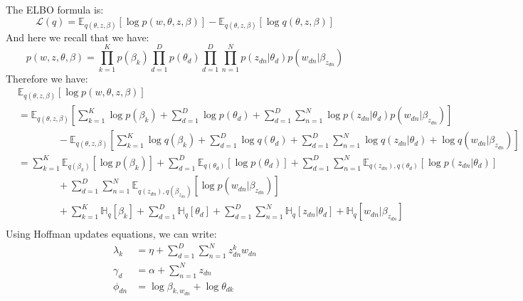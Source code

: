 \documentclass{article}
\begin{document}
The ELBO formula is:
\begin{equation}
    \mathcal{L}(q) = \mathbb{E}_{q(\theta, z, \beta)}[\log p(w, \theta, z, \beta)] - \mathbb{E}_{q(\theta, z, \beta)}[\log q(\theta, z, \beta)]
\end{equation}
And here we recall that we have:
\begin{equation}
    p(w,z,\theta,\beta) = \prod_{k=1}^{K}p(\beta_k) \prod_{d=1}^{D}p(\theta_d) \prod_{d=1}^{D}\prod_{n=1}^{N}p(z_{dn}|\theta_d)p(w_{dn}|\beta_{z_{dn}})
\end{equation}
Therefore we have:
\begin{equation}
    \begin{split}
         & \mathbb{E}_{q(\theta, z, \beta)}[\log p(w, \theta, z, \beta)]                                                                                                                                                     \\
         & = \mathbb{E}_{q(\theta, z, \beta)}\left[\sum_{k=1}^{K}\log p(\beta_k) + \sum_{d=1}^{D}\log p(\theta_d) + \sum_{d=1}^{D}\sum_{n=1}^{N}\log p(z_{dn}|\theta_d)p(w_{dn}|\beta_{z_{dn}})\right]                       \\
         & \qquad\qquad - \mathbb{E}_{q(\theta, z, \beta)}\left[\sum_{k=1}^{K}\log q(\beta_k) + \sum_{d=1}^{D}\log q(\theta_d) + \sum_{d=1}^{D}\sum_{n=1}^{N}\log q(z_{dn}|\theta_d) + \log q(w_{dn}|\beta_{z_{dn}})\right]  \\
         & = \sum_{k=1}^{K}\mathbb{E}_{q(\beta_{k})}[\log p(\beta_{k})] + \sum_{d=1}^{D}\mathbb{E}_{q(\theta_d)}[\log p(\theta_d)] + \sum_{d=1}^{D}\sum_{n=1}^{N}\mathbb{E}_{q(z_{dn}),q(\theta_d)}[\log p(z_{dn}|\theta_d)] \\
         & \qquad\qquad + \sum_{d=1}^{D}\sum_{n=1}^{N}\mathbb{E}_{q(z_{dn}),q(\beta_{z_{dn}})}[\log p(w_{dn}|\beta_{z_{dn}})]                                                                                                \\
         & \qquad\qquad + \sum_{k=1}^{K}\mathbb{H}_q[\beta_k] + \sum_{d=1}^{D}\mathbb{H}_q[\theta_d] + \sum_{d=1}^{D}\sum_{n=1}^{N}\mathbb{H}_q[z_{dn}|\theta_d] + \mathbb{H}_q[w_{dn}|\beta_{z_{dn}}]                       \\
    \end{split}
\end{equation}
Using Hoffman updates equations, we can write:
\begin{equation}
    \begin{split}
        \lambda_k & = \eta + \sum_{d=1}^{D}\sum_{n=1}^{N}z_{dn}^k w_{dn} \\
        \gamma_d  & = \alpha + \sum_{n=1}^{N}z_{dn}                      \\
        \phi_{dn} & = \log \beta_{k,w_{dn}} + \log \theta_{dk}
    \end{split}
\end{equation}
\end{document}
